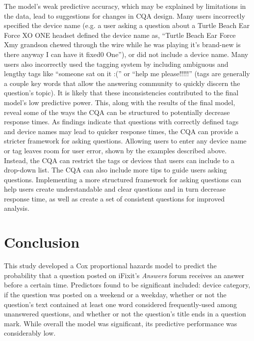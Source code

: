 \documentclass[preprint]{elsarticle}
\begin{document}
The model's weak predictive accuracy, which may be explained by limitations in the data, lead to suggestions for changes in CQA design. Many users incorrectly specified the device name (e.g. a user asking a question about a Turtle Beach Ear Force XO ONE headset defined the device name as, ``Turtle Beach Ear Force Xmy grandson chewed through the wire while he was playing it's brand-new is there anyway I can have it fixed0 One''), or did not include a device name. Many users also incorrectly used the tagging system by including ambiguous and lengthy tags like ``someone sat on it :('' or ``help me please!!!!!'' (tags are generally a couple key words that allow the answering community to quickly discern the question's topic). It is likely that these inconsistencies contributed to the final model's low predictive power. This, along with the results of the final model, reveal some of the ways the CQA can be structured to potentially decrease response times. As findings indicate that questions with correctly defined tags and device names may lead to quicker response times, the CQA can provide a stricter framework for asking questions. Allowing users to enter any device name or tag leaves room for user error, shown by the examples described above. Instead, the CQA can restrict the tags or devices that users can include to a drop-down list. The CQA can also include more tips to guide users asking questions. Implementing a more structured framework for asking questions can help users create understandable and clear questions and in turn decrease response time, as well as create a set of consistent questions for improved analysis. 


\section{Conclusion}

This study developed a Cox proportional hazards model to predict the probability that a question posted on iFixit's \textit{Answers} forum receives an answer before a certain time. Predictors found to be significant included: device category, if the question was posted on a weekend or a weekday, whether or not the question's text contained at least one word considered frequently-used among unanswered questions, and whether or not the question's title ends in a question mark. While overall the model was significant, its predictive performance was considerably low. 
\end{document}
